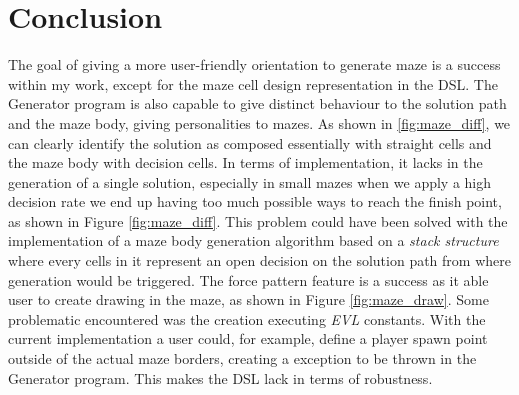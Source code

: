 \documentclass[review]{elsarticle}
\begin{document}
\section{Conclusion}
The goal of giving a more user-friendly orientation to generate maze is a success within my work, except for the maze cell design representation in the DSL. The Generator program is also capable to give distinct behaviour to the solution path and the maze body, giving personalities to mazes. As shown in  \ref{fig:maze_diff}, we can clearly identify the solution as composed essentially with straight cells and the maze body with decision cells. In terms of implementation, it lacks in the generation of a single solution, especially in small mazes when we apply a high decision rate we end up having too much possible ways to reach the finish point, as shown in Figure \ref{fig:maze_diff}. This problem could have been solved with the implementation of a maze body generation algorithm based on a \textit{stack structure} where every cells in it represent an open decision on the solution path from where generation would be triggered. The force pattern feature is a success as it able user to create drawing in the maze, as shown in Figure  \ref{fig:maze_draw}. Some problematic encountered was the creation executing \textit{EVL} constants. With the current implementation a user could, for example, define a player spawn point outside of the actual maze borders, creating a exception to be thrown in the Generator program. This makes the DSL lack in terms of robustness.


\end{document}
